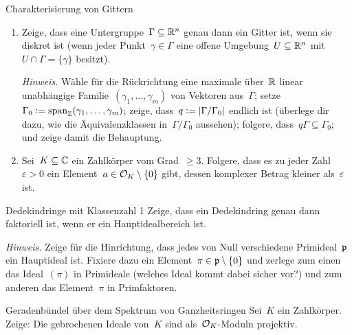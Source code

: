 \documentclass{uebblatt}
\begin{document}
\begin{aufgabe}{Charakterisierung von Gittern}
\begin{enumerate}
\item Zeige, dass eine Untergruppe~$\Gamma \subseteq \mathbb{R}^n$ genau dann ein Gitter
ist, wenn sie diskret ist (wenn jeder Punkt~$\gamma \in \Gamma$ eine
offene Umgebung~$U \subseteq \mathbb{R}^n$ mit~$U \cap \Gamma =
\{\gamma\}$ besitzt).

{\tiny\emph{Hinweis.} Wähle für die Rückrichtung eine maximale
über~$\mathbb{R}$ linear unabhängige Familie~$(\gamma_1,\ldots,\gamma_m)$ von Vektoren
aus~$\Gamma$; setze~$\Gamma_0 \vcentcolon=
\operatorname{span}_{\mathbb{Z}}(\gamma_1,\ldots,\gamma_m)$; zeige, dass~$q \vcentcolon=
|\Gamma/\Gamma_0|$ endlich ist (überlege dir dazu, wie die Äquivalenzklassen
in~$\Gamma/\Gamma_0$ aussehen); folgere, dass~$q\Gamma \subseteq \Gamma_0$; und
zeige damit die Behauptung.\par}
\item Sei~$K \subseteq \mathbb{C}$ ein Zahlkörper vom Grad~$\geq 3$. Folgere, dass es zu
jeder Zahl~$\varepsilon > 0$ ein Element~$a \in \mathcal{O}_K \setminus \{0\}$ gibt,
dessen komplexer Betrag kleiner als~$\varepsilon$ ist.
\end{enumerate}
\end{aufgabe}

\begin{aufgabe*}{Dedekindringe mit Klassenzahl 1}
Zeige, dass ein Dedekindring genau dann faktoriell ist, wenn er ein
Hauptidealbereich ist.

{\tiny\emph{Hinweis.} Zeige für die Hinrichtung, dass jedes von Null
verschiedene Primideal~$\mathfrak{p}$ ein Hauptideal ist. Fixiere dazu ein Element~$\pi
\in \mathfrak{p} \setminus \{0\}$ und zerlege zum einen das Ideal~$(\pi)$ in Primideale (welches
Ideal kommt dabei sicher vor?) und zum anderen das Element~$\pi$ in
Primfaktoren.\par}
\end{aufgabe*}

\begin{aufgabe*}{Geradenbündel über dem Spektrum von Ganzheitsringen}
Sei~$K$ ein Zahlkörper. Zeige: Die gebrochenen Ideale von~$K$ sind
als~$\mathcal{O}_K$-Moduln projektiv.
\end{aufgabe*}
\end{document}
